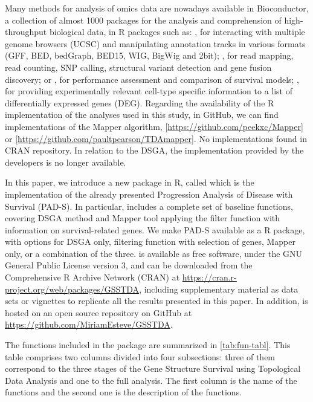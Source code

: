 Many methods for analysis of omics data are nowadays available in Bioconductor, a collection of almost 1000 packages for the analysis and comprehension of high-throughput biological data, in R packages such as:  \citep{lawrence2009rtracklayer}, for interacting with multiple genome browsers (UCSC) and manipulating annotation tracks in various formats (GFF, BED, bedGraph, BED15, WIG, BigWig and 2bit);  \citep{liao2019r}, for read mapping, read counting, SNP calling, structural variant detection and gene fusion discovery; or  \citep{schroder2011survcomp}, for performance assessment and comparison of survival models;  \citep{sokolowski2021single}, for providing experimentally relevant cell-type specific information to a list of differentially expressed genes (DEG). Regarding the availability of the R implementation of the analyses used in this study, in GitHub, we can find implementations of the Mapper algorithm,  {[}\url{https://github.com/peekxc/Mapper}{]} or  {[}\url{https://github.com/paultpearson/TDAmapper}{]}. No implementations found in CRAN repository. In relation to the DSGA, the implementation provided by the developers is no longer available.

In this paper, we introduce a new package in R, called  which is the implementation of the already presented Progression Analysis of Disease with Survival (PAD-S). In particular,  includes a complete set of baseline functions, covering DSGA method and Mapper tool applying the filter function with information on survival-related genes. We make PAD-S available as a R package, with options for DSGA only, filtering function with selection of genes, Mapper only, or a combination of the three.  is available as free software, under the GNU General Public License version 3, and can be downloaded from the Comprehensive R Archive Network (CRAN) at \url{https://cran.r-project.org/web/packages/GSSTDA}, including supplementary material as data sets or vignettes to replicate all the results presented in this paper. In addition,  is hosted on an open source repository on GitHub at \url{https://github.com/MiriamEsteve/GSSTDA}.

The functions included in the  package are summarized in \ref{tab:fun-tabl}. This table comprises two columns divided into four subsections: three of them correspond to the three stages of the Gene Structure Survival using Topological Data Analysis and one to the full analysis. The first column is the name of the functions and the second one is the description of the functions.

